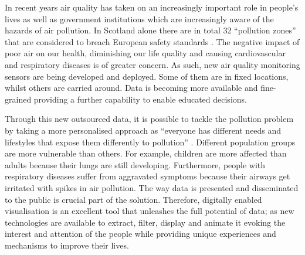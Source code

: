 In recent years air quality has taken on an increasingly important role in people's lives as well as government institutions which are increasingly aware of the hazards of air pollution. In Scotland alone there are in total 32 ``pollution zones'' that are considered to breach European safety standards \cite{Foe-scotland.org.uk} \cite{OKScotland2015}. The negative impact of poor air on our health, diminishing our life quality and causing cardiovascular and respiratory diseases is of greater concern. As such, new air quality monitoring sensors are being developed and deployed. Some of them are in fixed locations, whilst others are carried around. Data is becoming more available and fine-grained providing a further capability to enable educated decisions.

Through this new outsourced data, it is possible to tackle the pollution problem by taking a  more personalised approach as ``everyone has different needs and lifestyles that expose them differently to pollution'' \cite{Vazquez2016}. Different population groups are more vulnerable than others. For example, children are more affected than adults because their lungs are still developing. Furthermore, people with respiratory diseases suffer from aggravated symptoms because their airways get irritated with spikes in air pollution. The way data is presented and disseminated to the public is crucial part of the solution. Therefore, digitally enabled visualisation is an excellent tool that unleashes the full potential of data; as new technologies are available to extract, filter, display and animate it evoking the interest and attention of the people while providing unique experiences and mechanisms to improve their lives.

\iffalse
The effects of air pollution on human health are still complex to understand and there is much research ongoing on the combination short and long term effects upon a person's health. 
\fi